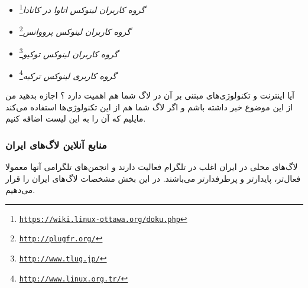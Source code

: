 \begin{itemize}
\emph{گروه کاربران لینوکس تگزاس شمالی}\footnote{\texttt{\url{http://www.ntlug.org/}}}
\item
\emph{گروه کاربران لینوکس اتاوا در کانادا}\footnote{\texttt{\url{https://wiki.linux-ottawa.org/doku.php}}}
\item
\emph{گروه کاربران لینوکس پرووانس}\footnote{\texttt{\url{http://plugfr.org/}}}
\item
\emph{گروه کاربران لینوکس توکیو}\footnote{\texttt{\url{http://www.tlug.jp/}}}
\item
\emph{گروه کاربری لینوکس ترکیه}\footnote{\texttt{\url{http://www.linux.org.tr/}}}
\end{itemize}

آیا اینترنت و تکنولوژی‌های مبتنی بر آن در لاگ شما هم اهمیت دارد ؟ اجازه بدهید
من از این موضوع خبر داشته باشم و اگر لاگ شما هم از این تکنولوژی‌ها استفاده می‌کند
مایلیم که آن را به این لیست اضافه کنیم.

\subsubsection{منابع آنلاین لاگ‌های ایران}
لاگ‌های محلی در ایران اغلب در تلگرام فعالیت دارند و انجمن‌های تلگرامی آنها معمولا
فعال‌تر، پایدارتر و پرطرفدارتر می‌باشند. در این بخش مشخصات لاگ‌های ایران را قرار می‌دهیم.

